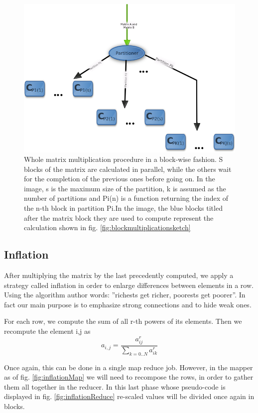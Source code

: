 \begin{figure}[H]
\centering
\includegraphics[scale=0.7]{matrixmultiplication.png}
\caption{Whole matrix multiplication procedure in a block-wise fashion. S blocks of the matrix are calculated
in parallel, while the others wait for the completion of the previous ones before going on.
In the image, s is the maximum size of the partition, k is assumed as the number of partitions and Pi(n) is a function
returning the index of the n-th block in partition Pi.In the image, the blue blocks titled after the matrix block they are used to compute represent the calculation shown in fig. \ref{fig:blockmultiplicationsketch}}
\label{fig:matrixmultiplicationsketch}
\end{figure}

\subsection{Inflation}

After multiplying the matrix by the last precedently computed, we apply a strategy
called inflation in order to enlarge differences between elements in a row.
Using the algorithm author words: ''richests get richer, poorests get poorer''.
In fact our main purpose is to emphasize strong connections and to hide
weak ones.

For each row, we compute the sum of all r-th powers of its elements.
Then we recompute the element i,j as
$$ a_{i,j} = \frac{a_{ij}^r} {\sum_{k=0..N} a_{ik}^r}$$

Once again, this can be done in a single map reduce job. However, in the mapper as of fig. \ref{fig:inflationMap} we will need to recompose the rows, in order to gather them all together in the reducer. In this last phase whose pseudo-code is displayed in fig. \ref{fig:inflationReduce} re-scaled values will be divided once again in blocks.

